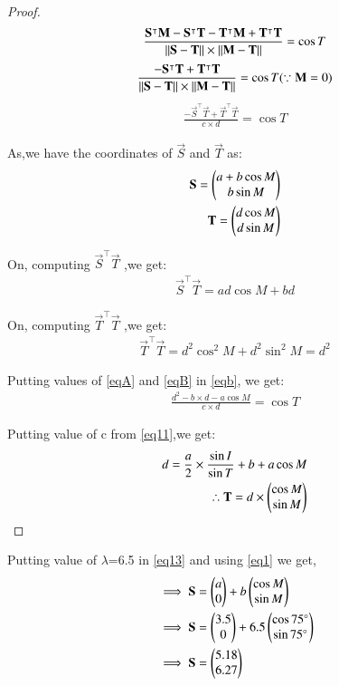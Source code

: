 \documentclass[journal,12pt,twocolumn]{IEEEtran}
\begin{document}
\begin{enumerate}
\begin{proof}
\begin{align}
\frac{\mathbf{S}^\intercal\mathbf{M}-\mathbf{S}^\intercal \mathbf{T}-\mathbf{T}^\intercal\mathbf{M}+\mathbf{T}^\intercal \mathbf{T}}{\Vert\mathbf{S-T}\rVert\times\Vert\mathbf{M-T}\rVert}=\cos T
\end{align}
\begin{align}
\frac{-\mathbf{S}^\intercal \mathbf{T}+\mathbf{T}^\intercal \mathbf{T}}{\Vert\mathbf{S-T}\rVert\times\Vert\mathbf{M-T}\rVert} = \cos T ( \because \mathbf{M}=0) 
\end{align}
\begin{align}
\frac{-\vec{S}^\intercal \vec{T}+\vec{T}^\intercal \vec{T}}{c\times d} =\cos T \label{eqb}
\end{align}
\item As,we have the coordinates of $\vec{S}$ and $\vec{T}$ as:
\begin{align}
    \mathbf{S}=\begin{pmatrix}a+b\cos M\\b\sin M\end{pmatrix}
    \\
    \mathbf{T}=\begin{pmatrix}d\cos M\\d\sin M\end{pmatrix}
\end{align}
\item On, computing $\vec{S}^\intercal \vec{T}$ ,we get:
\begin{align}
\vec{S}^\intercal \vec{T}= ad \cos M + bd \label{eqA}
\end{align}
\item On, computing $\vec{T}^\intercal \vec{T}$ ,we get:
\begin{align}
    \vec{T}^\intercal \vec{T}= d^2\cos^2 M+d^2\sin^2 M=d^2 
    \label{eqB}
\end{align}
\item Putting values of \eqref{eqA} and \eqref{eqB} in \eqref{eqb}, we get:
\begin{align}
\frac{d^2-b\times d-a\cos M}{c\times d} =\cos T
\end{align}
\item Putting value of c from \eqref{eq11},we get:
\begin{align}
d=\frac{a}{2}\times\frac{\sin I}{\sin T}+ b+a \cos M    \label{eqa}
\\
\therefore \mathbf{T}=d \times{\ensuremath{\begin{pmatrix}\cos M\\ \sin M\end{pmatrix}}}
\end{align}
\end{proof}
\item Putting value of $\lambda$=6.5 in \eqref{eq13} and using \eqref{eq1} we get,
\begin{align}
&\implies \mathbf{S}=\begin{pmatrix}a\\0\end{pmatrix} +b\begin{pmatrix}\cos M \\\sin M\end{pmatrix}
\\
&\implies \mathbf{S}=\begin{pmatrix}3.5\\0\end{pmatrix} +6.5\begin{pmatrix}\cos 75 \degree\\\sin 75 \degree\end{pmatrix} 
\\
&\implies \mathbf{S}=\begin{pmatrix}5.18\\6.27\end{pmatrix}
\end{align}


\end{enumerate}
\end{document}
